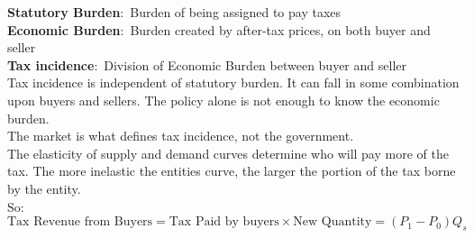 \documentclass[nobib]{tufte-handout}
\newcommand{\defn}[2]{\noindent\textbf{#1}:\ #2}
\begin{document}
\defn{Statutory Burden}{Burden of being assigned to pay taxes}\\
\defn{Economic Burden}{Burden created by after-tax prices, on both buyer and seller}\\
\defn{Tax incidence}{Division of Economic Burden between buyer and seller}\\
Tax incidence is independent of statutory burden. It can fall in some combination upon buyers and sellers. The policy alone is not enough to know the economic burden.\\
The market is what defines tax incidence, not the government.\\
The elasticity of supply and demand curves determine who will pay more of the tax. The more inelastic the entities curve, the larger the portion of the tax borne by the entity.\\
So:
\begin{equation*}
    \text{Tax Revenue from Buyers} = \text{Tax Paid by buyers} \times \text{New Quantity} = (P_1-P_0)Q_s
\end{equation*}
\begin{center}
\end{center}
\end{document}
